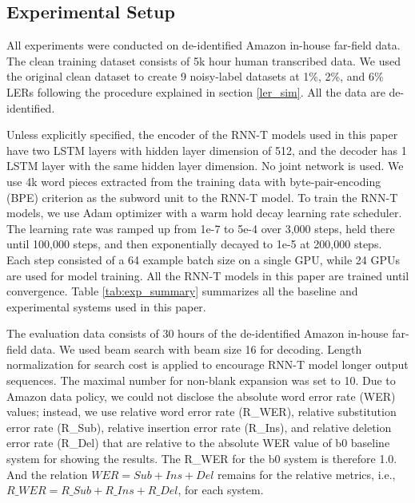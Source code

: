 \documentclass{article}
\begin{document}
\subsection{Experimental Setup}

All experiments were conducted on de-identified Amazon in-house far-field data. The clean training dataset consists of 5k hour human transcribed data. We used the original clean dataset to create 9 noisy-label datasets at 1\%, 2\%, and 6\% LERs following the procedure explained in section \ref{ler_sim}. All the data are de-identified.

Unless explicitly specified, the encoder of the RNN-T models used in this paper have two LSTM layers with hidden layer dimension of 512, and the decoder has 1 LSTM layer with the same hidden layer dimension. No joint network is used. We use 4k word pieces extracted from the training data with byte-pair-encoding (BPE) criterion as the subword unit to the RNN-T model. 
To train the RNN-T models, we use Adam optimizer with a warm hold decay learning rate scheduler. The learning rate was ramped up from  1e-7 to 5e-4 over 3,000 steps, held there until 100,000 steps, and then exponentially decayed to 1e-5 at 200,000 steps. Each step consisted of a 64 example batch size on a single GPU, while 24 GPUs are used for model training. All the RNN-T models in this paper are trained until convergence. Table \ref{tab:exp_summary} summarizes all the baseline and experimental systems used in this paper.


The evaluation data consists of 30 hours of the de-identified Amazon in-house far-field data. We used beam search with beam size 16 for decoding. Length normalization for search cost is applied to encourage RNN-T model longer output sequences. The maximal number for non-blank expansion was set to 10. Due to Amazon data policy, we could not disclose the absolute word error rate (WER) values; instead, we use relative word error rate (R\_WER), relative substitution error rate (R\_Sub), relative insertion error rate (R\_Ins), and relative deletion error rate (R\_Del) that are relative to the absolute WER value of b0 baseline system for showing the results. The R\_WER for the b0 system is therefore 1.0. And the relation $WER=Sub+Ins+Del$ remains for the relative metrics, i.e., $R\_WER=R\_Sub+R\_Ins+R\_Del$, for each system.
\end{document}
